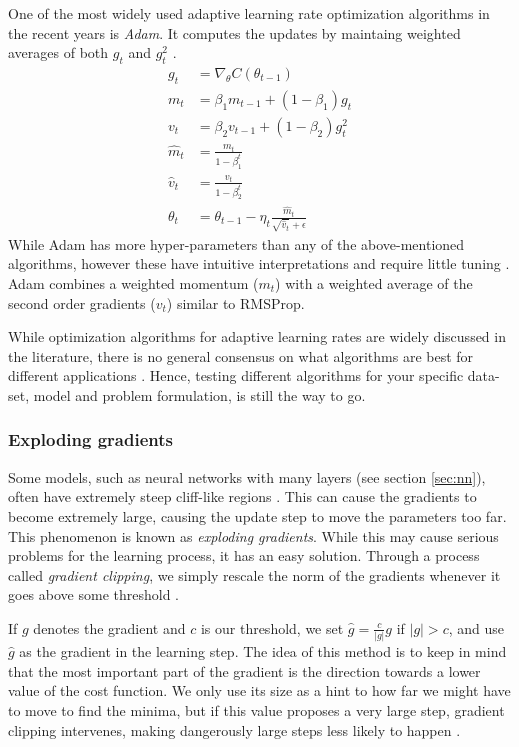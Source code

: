 One of the most widely used adaptive learning rate optimization algorithms in the recent years is \textit{Adam}.
It computes the updates by maintaing weighted averages of both $g_t$ and $g_t^2$ \citep[p. 123]{Ketkar2017}.
\begin{equation}\label{eq:updt_adam}
\begin{split}
    g_t &= \nabla_{\theta}C(\theta_{t-1})   \\
    m_t &= \beta_1m_{t-1} + (1-\beta_1)g_t \\
    v_t &= \beta_2v_{t-1} + (1-\beta_2)g_t^2 \\
    \hat{m}_t &= \frac{m_t}{1-\beta_1^t} \\
    \hat{v}_t &= \frac{v_t}{1-\beta_2^t} \\
    \theta_{t} &= \theta_{t-1} - \eta_t \frac{\hat{m}_t}{\sqrt{\hat{v}_t}+\epsilon}
\end{split}
\end{equation}
While Adam has more hyper-parameters than any of the above-mentioned algorithms, however these have intuitive interpretations and require little tuning \cite{kingba}.
Adam combines a weighted momentum ($m_t$) with a weighted average of the second order gradients ($v_t$) similar to RMSProp.

While optimization algorithms for adaptive learning rates are widely discussed in the literature, there is no general consensus on what algorithms are best for different applications \cite{schaul2014}.
Hence, testing different algorithms for your specific data-set, model and problem formulation, is still the way to go.

\subsubsection{Exploding gradients}
Some models, such as neural networks with many layers (see section \ref{sec:nn}), often have extremely steep cliff-like regions \citep[p. 285]{Goodfellow-et-al-2016}.
This can cause the gradients to become extremely large, causing the update step to move the parameters too far.
This phenomenon is known as \textit{exploding gradients}.
While this may cause serious problems for the learning process, it has an easy solution.
Through a process called \textit{gradient clipping}, we simply rescale the norm of the gradients whenever it goes above some threshold \citep[p. 93]{Ketkar2017}.

If $g$ denotes the gradient and $c$ is our threshold, we set $\hat{g} = \frac{c}{|g|}g$ if $|g|>c$, and use $\hat{g}$ as the gradient in the learning step.
The idea of this method is to keep in mind that the most important part of the gradient is the direction towards a lower value of the cost function.
We only use its size as a hint to how far we might have to move to find the minima, but if this value proposes a very large step, gradient clipping intervenes, making dangerously large steps less likely to happen \citep[p. 286]{Goodfellow-et-al-2016}.

